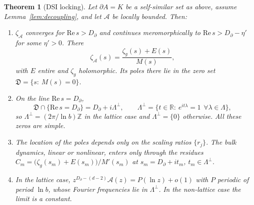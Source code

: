 \documentclass[11pt]{article}
\newtheorem{theorem}{Theorem}
\theoremstyle{definition}\newtheorem{definition}{Definition}[section]
\theoremstyle{remark}\newtheorem*{remark}{Remark}
\newcommand{\cA}{\mathcal{A}}
\newcommand{\cD}{\mathfrak{D}}
\newcommand{\RR}{\mathbb{R}}
\newcommand{\ZZ}{\mathbb{Z}}
\begin{document}
\begin{theorem}[DSI locking]
\label{thm:dsi}
Let $\partial A=K$ be a self-similar set as above, assume Lemma~\ref{lem:decoupling}, and let $\cA$ be
locally bounded. Then:
\begin{enumerate}
\item[(i)] $\zeta_\cA$ converges for $\mathrm{Re}\,s>D_\partial$ and continues meromorphically to
$\mathrm{Re}\,s>D_\partial-\eta'$ for some $\eta'>0$. There
\begin{equation}
\zeta_\cA(s)=\frac{\zeta_g(s)+E(s)}{M(s)},
\label{eq:zetafactor}
\end{equation}
with $E$ entire and $\zeta_g$ holomorphic. Its poles there lie in the zero set
$\cD=\{s:\ M(s)=0\}$.
\item[(ii)] On the line $\mathrm{Re}\,s=D_\partial$,
\begin{equation}
\cD\cap\{\mathrm{Re}\,s=D_\partial\}=D_\partial+i\Lambda^\perp,\qquad
\Lambda^\perp=\{t\in\RR:\ e^{it\lambda}=1\ \ \forall\lambda\in\Lambda\},
\end{equation}
so $\Lambda^\perp=(2\pi/\ln b)\ZZ$ in the lattice case and $\Lambda^\perp=\{0\}$ otherwise. All these zeros
are simple.
\item[(iii)] The location of the poles depends only on the scaling ratios $\{r_j\}$. The bulk dynamics, linear
or nonlinear, enters only through the residues
$C_m=\big(\zeta_g(s_m)+E(s_m)\big)/M'(s_m)$ at $s_m=D_\partial+i t_m$, $t_m\in\Lambda^\perp$.
\item[(iv)] In the lattice case, $z^{D_\partial-(d-2)}\cA(z)=P(\ln z)+o(1)$ with $P$ periodic of period
$\ln b$, whose Fourier frequencies lie in $\Lambda^\perp$. In the non-lattice case the limit is a constant.
\end{enumerate}
\end{theorem}
\end{document}
